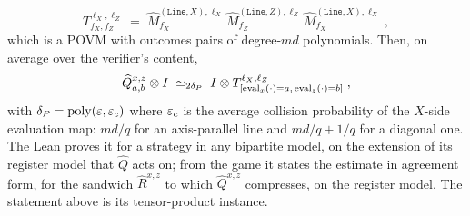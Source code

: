 \begin{lemma}
\begin{equation*}
  T^{\ell_X, \ell_Z}_{f_X, f_Z}
    \;=\; \widehat{M}^{(\mathtt{Line}, X), \ell_X}_{f_X}\,
      \widehat{M}^{(\mathtt{Line}, Z), \ell_Z}_{f_Z}\,
      \widehat{M}^{(\mathtt{Line}, X), \ell_X}_{f_X}\;,
\end{equation*}
which is a POVM with outcomes pairs of degree-$md$ polynomials. Then, on average over the
verifier's content,
\begin{equation}
  \label{eq:qld-pairs-of-lines-bp}
  \widehat{Q}^{x,z}_{a,b} \otimes I
    \;\simeq_{2 \delta_P}\; I \otimes T^{\ell_X, \ell_Z}_{[\mathrm{eval}_x(\cdot) = a,\,
      \mathrm{eval}_z(\cdot) = b]}\;,
\end{equation}
with $\delta_P = \mathrm{poly}(\varepsilon, \varepsilon_c)$ where $\varepsilon_c$ is the average collision probability of the
$X$-side evaluation map: $md/q$ for an axis-parallel line and $md/q + 1/q$ for a diagonal one.
The Lean proves it for a strategy in any bipartite model, on the extension of its register model
that $\widehat{Q}$ acts on; from the game it states the estimate in agreement form, for the
sandwich $\widehat{R}^{x,z}$ to which $\widehat{Q}^{x,z}$ compresses, on the register model. The
statement above is its tensor-product instance.
\end{lemma}

